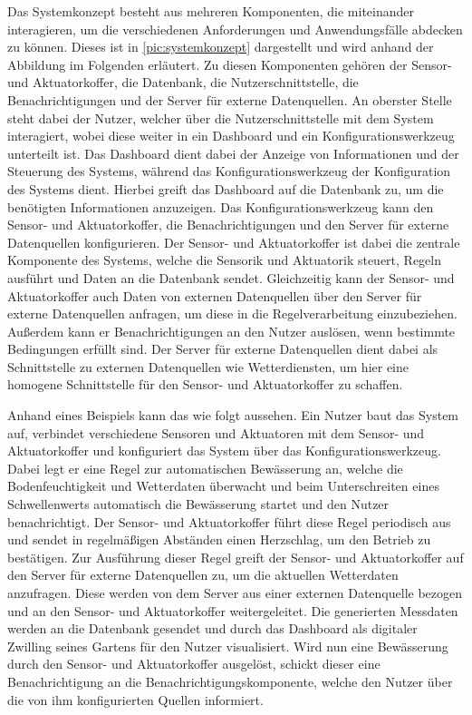 Das Systemkonzept besteht aus mehreren Komponenten, die miteinander interagieren, um die verschiedenen Anforderungen und Anwendungsfälle abdecken zu können.
Dieses ist in \cref{pic:systemkonzept} dargestellt und wird anhand der Abbildung im Folgenden erläutert.
Zu diesen Komponenten gehören der Sensor- und Aktuatorkoffer, die Datenbank, die Nutzerschnittstelle, die Benachrichtigungen und der Server für externe Datenquellen.
An oberster Stelle steht dabei der Nutzer, welcher über die Nutzerschnittstelle mit dem System interagiert, wobei diese weiter in ein Dashboard und ein Konfigurationswerkzeug unterteilt ist.
Das Dashboard dient dabei der Anzeige von Informationen und der Steuerung des Systems, während das Konfigurationswerkzeug der Konfiguration des Systems dient.
Hierbei greift das Dashboard auf die Datenbank zu, um die benötigten Informationen anzuzeigen.
Das Konfigurationswerkzeug kann den Sensor- und Aktuatorkoffer, die Benachrichtigungen und den Server für externe Datenquellen konfigurieren.
Der Sensor- und Aktuatorkoffer ist dabei die zentrale Komponente des Systems, welche die Sensorik und Aktuatorik steuert, Regeln ausführt und Daten an die Datenbank sendet.
Gleichzeitig kann der Sensor- und Aktuatorkoffer auch Daten von externen Datenquellen über den Server für externe Datenquellen anfragen, um diese in die Regelverarbeitung einzubeziehen.
Außerdem kann er Benachrichtigungen an den Nutzer auslösen, wenn bestimmte Bedingungen erfüllt sind.
Der Server für externe Datenquellen dient dabei als Schnittstelle zu externen Datenquellen wie Wetterdiensten, um hier eine homogene Schnittstelle für den Sensor- und Aktuatorkoffer zu schaffen.

Anhand eines Beispiels kann das wie folgt aussehen.  %
Ein Nutzer baut das System auf, verbindet verschiedene Sensoren und Aktuatoren mit dem Sensor- und Aktuatorkoffer und konfiguriert das System über das Konfigurationswerkzeug.
Dabei legt er eine Regel zur automatischen Bewässerung an, welche die Bodenfeuchtigkeit und Wetterdaten überwacht und beim Unterschreiten eines Schwellenwerts automatisch die Bewässerung startet und den Nutzer benachrichtigt.
Der Sensor- und Aktuatorkoffer führt diese Regel periodisch aus und sendet in regelmäßigen Abständen einen Herzschlag, um den Betrieb zu bestätigen.
Zur Ausführung dieser Regel greift der Sensor- und Aktuatorkoffer auf den Server für externe Datenquellen zu, um die aktuellen Wetterdaten anzufragen.
Diese werden von dem Server aus einer externen Datenquelle bezogen und an den Sensor- und Aktuatorkoffer weitergeleitet.
Die generierten Messdaten werden an die Datenbank gesendet und durch das Dashboard als digitaler Zwilling seines Gartens für den Nutzer visualisiert.
Wird nun eine Bewässerung durch den Sensor- und Aktuatorkoffer ausgelöst, schickt dieser eine Benachrichtigung an die Benachrichtigungskomponente, welche den Nutzer über die von ihm konfigurierten Quellen informiert.


